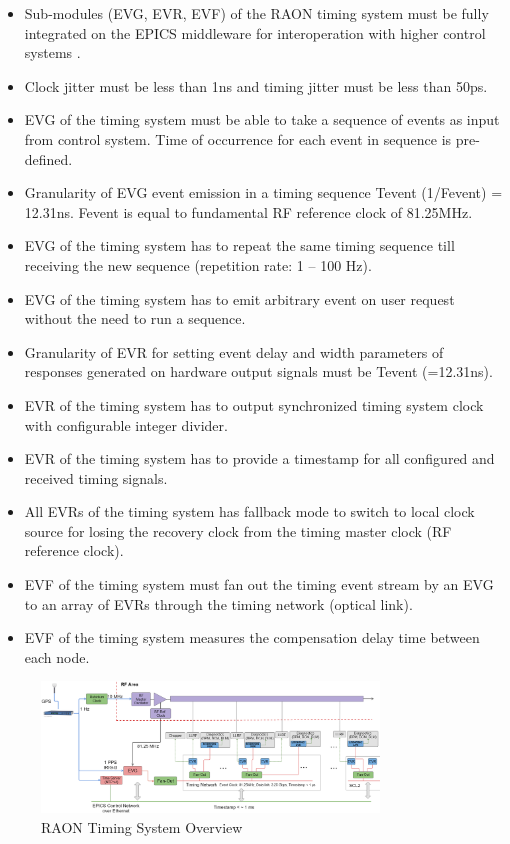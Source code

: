 \documentclass[journal,reqno]{IEEEtran}
\begin{document}
\begin{itemize}
	\item Sub-modules (EVG, EVR, EVF) of the RAON timing system must be fully integrated on the EPICS middleware for interoperation with higher control systems \cite{epics}.
	\item Clock jitter must be less than 1ns and timing jitter must be less than 50ps.
	\item EVG of the timing system must be able to take a sequence of events as input from control system. Time of occurrence for each event in sequence is pre-defined.
	\item Granularity of EVG event emission in a timing sequence Tevent (1/Fevent) = 12.31ns. Fevent is equal to fundamental RF reference clock of 81.25MHz.
	\item EVG of the timing system has to repeat the same timing sequence till receiving the new sequence (repetition rate: 1 – 100 Hz).
	\item EVG of the timing system has to emit arbitrary event on user request without the need to run a sequence.
	\item Granularity of EVR for setting event delay and width parameters of responses generated on hardware output signals must be Tevent (=12.31ns). 
	\item EVR of the timing system has to output synchronized timing system clock with configurable integer divider.
	\item EVR of the timing system has to provide a timestamp for all configured and received timing signals.
	\item All EVRs of the timing system has fallback mode to switch to local clock source for losing the recovery clock from the timing master clock (RF reference clock).
	\item EVF of the timing system must fan out the timing event stream by an EVG to an array of EVRs through the timing network (optical link).
	\item EVF of the timing system measures the compensation delay time between each node.
\end{itemize}

\begin{figure}[!htb]
	\centering
	\includegraphics*[width=0.8\textwidth, height=0.45\textwidth]{img25.png}
	\caption{RAON Timing System Overview}
	\label{timing_overview}
\end{figure}
\end{document}
